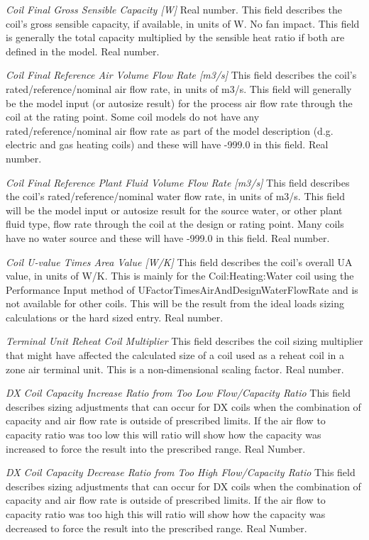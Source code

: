 \emph{Coil Final Gross Sensible Capacity [W]} Real number. This field describes the coil's gross sensible capacity, if available, in units of W. No fan impact.  This field is generally the total capacity multiplied by the sensible heat ratio if both are defined in the model. Real number.

\emph{Coil Final Reference Air Volume Flow Rate [m3/s]}  This field describes the coil's rated/reference/nominal air flow rate, in units of m3/s.  This field will generally be the model input (or autosize result) for the process air flow rate through the coil at the rating point.  Some coil models do not have any rated/reference/nominal air flow rate as part of the model description (d.g. electric and gas heating coils) and these will have -999.0 in this field. Real number.

\emph{Coil Final Reference Plant Fluid Volume Flow Rate [m3/s]}  This field describes the coil's rated/reference/nominal water flow rate, in units of m3/s.  This field will be the model input or autosize result for the source water, or other plant fluid type, flow rate through the coil at the design or rating point.  Many coils have no water source and these will have -999.0 in this field.  Real number.

\emph{Coil U-value Times Area Value [W/K]} This field describes the coil's overall UA value, in units of W/K.  This is mainly for the Coil:Heating:Water coil using the Performance Input method of UFactorTimesAirAndDesignWaterFlowRate and is not available for other coils.  This will be the result from the ideal loads sizing calculations or the hard sized entry.  Real number.

\emph{Terminal Unit Reheat Coil Multiplier}  This field describes the coil sizing multiplier that might have affected the calculated size of a coil used as a reheat coil in a zone air terminal unit.  This is a non-dimensional scaling factor.  Real number.

\emph{DX Coil Capacity Increase Ratio from Too Low Flow/Capacity Ratio}  This field describes sizing adjustments that can occur for DX coils when the combination of capacity and air flow rate is outside of prescribed limits.  If the air flow to capacity ratio was too low this will ratio will show how the capacity was increased to force the result into the prescribed range.  Real Number.

\emph{DX Coil Capacity Decrease Ratio from Too High Flow/Capacity Ratio}  This field describes sizing adjustments that can occur for DX coils when the combination of capacity and air flow rate is outside of prescribed limits.  If the air flow to capacity ratio was too high this will ratio will show how the capacity was decreased to force the result into the prescribed range.  Real Number.

